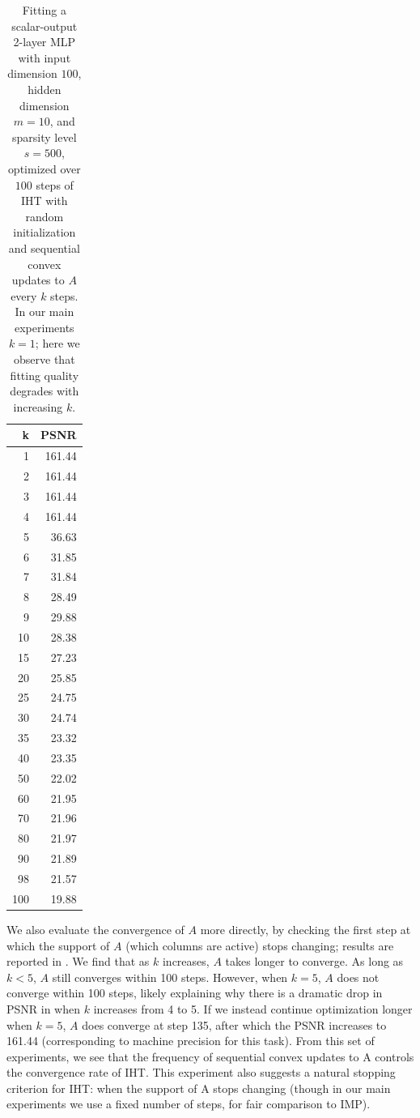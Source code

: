 \documentclass{article} %
\newcommand{\1}{\ensuremath{{\sf (i)}}}
\newcommand{\2}{\ensuremath{{\sf (ii)}}}
\newcommand{\3}{\ensuremath{{\sf (iii)}}}
\newcommand{\4}{\ensuremath{{\sf (iv)}}}
\newcommand{\5}{\ensuremath{{\sf (v)}}}
\newcommand{\6}{\ensuremath{{\sf (vi)}}}
\begin{document}
\begin{table}[ht]
    \centering
    \begin{tabular}{r|r}
k &	PSNR \\
\hline
1 &	161.44 \\
2 &	161.44 \\
3 &	161.44 \\
4 &	161.44 \\
5 &	36.63 \\
6 &	31.85 \\
7 &	31.84 \\
8 &	28.49 \\
9 &	29.88 \\
10 &	28.38 \\
15 &	27.23 \\
20 &	25.85 \\
25 &	24.75 \\
30 &	24.74 \\
35 &	23.32 \\
40 &	23.35 \\
50 &	22.02 \\
60 &	21.95 \\
70 &	21.96 \\
80 &	21.97 \\
90 &	21.89 \\
98 &	21.57 \\
100 &	19.88
    \end{tabular}
    \caption{Fitting a scalar-output 2-layer MLP with input dimension $100$, hidden dimension $m=10$, and sparsity level $s=500$, optimized over $100$ steps of IHT with random initialization and sequential convex updates to $A$ every $k$ steps. In our main experiments $k=1$; here we observe that fitting quality degrades with increasing $k$.}
    \label{tab:Aconvergence1}
\end{table}

We also evaluate the convergence of $A$ more directly, by checking the first step at which the support of $A$ (which columns are active) stops changing; results are reported in . We find that as $k$ increases, $A$ takes longer to converge. As long as $k<5$, $A$ still converges within 100 steps. However, when $k=5$, $A$ does not converge within 100 steps, likely explaining why there is a dramatic drop in PSNR in  when $k$ increases from 4 to 5. If we instead continue optimization longer when $k=5$, $A$ does converge at step 135, after which the PSNR increases to 161.44 (corresponding to machine precision for this task). From this set of experiments, we see that the frequency of sequential convex updates to A controls the convergence rate of IHT. This experiment also suggests a natural stopping criterion for IHT: when the support of A stops changing (though in our main experiments we use a fixed number of steps, for fair comparison to IMP).
\end{document}
